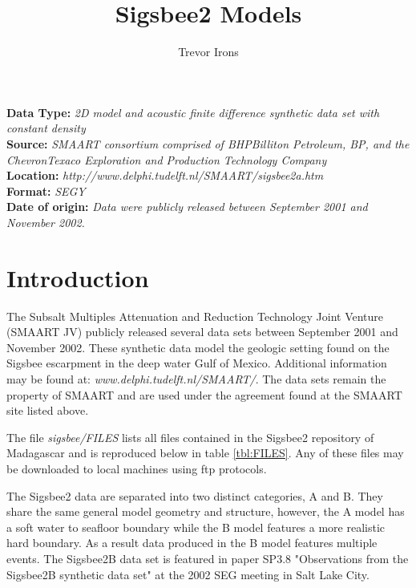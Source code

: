 \title{Sigsbee2 Models}
\author{Trevor Irons}
\maketitle

\lstset{language=python,numbers=left,numberstyle=\tiny,showstringspaces=false}

\noindent
\textbf	{Data Type:} \emph{2D model and acoustic finite difference synthetic data set with constant density}\\
\textbf	{Source:} \emph{SMAART consortium comprised of BHPBilliton Petroleum, BP, and the ChevronTexaco Exploration 
and Production Technology Company}\\
\textbf {Location:} \emph{http://www.delphi.tudelft.nl/SMAART/sigsbee2a.htm}\\
\textbf	{Format:} \emph{SEGY} \\
\textbf{Date of origin:} \emph{Data were publicly released between September 2001 and November 2002.}\\ 

\section{Introduction}
The Subsalt Multiples Attenuation and Reduction Technology Joint Venture (SMAART JV) publicly released several data sets 
between September 2001 and November 2002.  These synthetic data model the geologic setting found on the Sigsbee escarpment 
in the deep water Gulf of Mexico.  Additional information may be found at: \emph{www.delphi.tudelft.nl/SMAART/}.  
The data sets remain the property of SMAART and are used under the agreement found at the SMAART site listed above.  

The file \emph{sigsbee/FILES} lists all files contained in the Sigsbee2 repository of Madagascar and is reproduced below in
table \ref{tbl:FILES}.  Any of these files may be downloaded to local machines using ftp protocols.  

The Sigsbee2 data are separated into two distinct categories, A and B.  They share the same general model geometry and structure,
however, the A model has a soft water to seafloor boundary while the B model features a more realistic hard boundary.  As a result 
data produced in the B model features multiple events.  The Sigsbee2B data set is featured in paper SP3.8 "Observations from the 
Sigsbee2B synthetic data set" at the 2002 SEG meeting in Salt Lake City.  

{
\tiny

\normalsize
}

